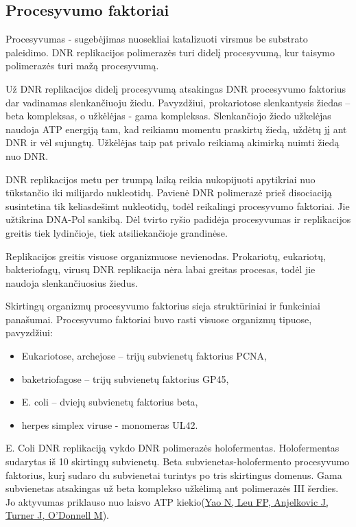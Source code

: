 \documentclass[a4paper,12pt]{article}
\begin{document}
\subsection{Procesyvumo faktoriai}

\qquad Procesyvumas - sugebėjimas nuosekliai katalizuoti virsmus be substrato paleidimo. DNR replikacijos polimerazės turi didelį procesyvumą, kur taisymo polimerazės turi mažą procesyvumą.
 
\qquad Už DNR replikacijos didelį procesyvumą atsakingas DNR procesyvumo faktorius dar vadinamas slenkančiuoju žiedu. Pavyzdžiui, prokariotose slenkantysis žiedas – beta kompleksas, o užkėlėjas - gama kompleksas. Slenkančiojo žiedo užkelėjas naudoja ATP energiją tam, kad  reikiamu momentu praskirtų žiedą, uždėtų jį ant DNR ir vėl sujungtų. Užkėlėjas taip pat privalo reikiamą akimirką nuimti žiedą nuo DNR.

\qquad DNR replikacijos metu per trumpą laiką reikia nukopijuoti apytikriai nuo tūkstančio iki milijardo nukleotidų. Pavienė DNR polimerazė prieš disociaciją susintetina tik keliasdešimt nukleotidų, todėl reikalingi procesyvumo faktoriai.  Jie  užtikrina DNA-Pol sankibą. Dėl tvirto ryšio padidėja procesyvumas ir replikacijos greitis tiek lydinčioje, tiek atsiliekančioje grandinėse.

\qquad Replikacijos greitis visuose organizmuose nevienodas. Prokariotų, eukariotų, bakteriofagų, virusų DNR replikacija nėra labai greitas procesas, todėl jie naudoja slenkančiuosius žiedus. 

\qquad Skirtingų organizmų procesyvumo faktorius sieja struktūriniai ir funkciniai panašumai. Procesyvumo faktoriai buvo rasti visuose organizmų tipuose, pavyzdžiui:

\begin{itemize}
	\item Eukariotose, archejose – trijų subvienetų  faktorius PCNA, 
	\item baketriofagose – trijų subvienetų faktorius GP45,
	\item E. coli – dviejų subvienetų faktorius beta,
	\item herpes simplex viruse -  monomeras UL42.
\end{itemize}


\qquad E. Coli DNR replikaciją vykdo DNR polimerazės holofermentas. Holofermentas sudarytas iš 10 skirtingų subvienetų. Beta subvienetas-holofermento procesyvumo faktorius, kurį sudaro du subvienetai turintys po tris skirtingus domenus. Gama subvienetas atsakingas už beta komplekso užkėlimą ant polimerazės III šerdies. Jo aktyvumas priklauso nuo laisvo ATP kiekio(\hyperlink{YaoN}{Yao N, Leu FP, Anjelkovic J, Turner J, O'Donnell M}). 
	
\end{document}
